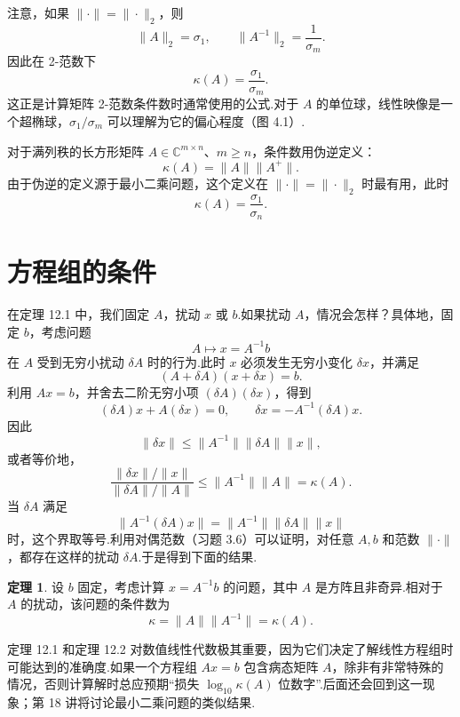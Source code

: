 \documentclass[UTF8,fontset=none,12pt]{ctexart}
\newcommand{\C}{\mathbb{C}}
\theoremstyle{definition}
\newtheorem{theorem}{定理}
\begin{document}
注意，如果 $\|\cdot\|=\|\cdot\|_2$，则
\[
    \|A\|_2=\sigma_1,\qquad \|A^{-1}\|_2=\frac1{\sigma_m}.
\]
因此在 2-范数下
\begin{equation}
    \kappa(A)=\frac{\sigma_1}{\sigma_m}.
    \tag{12.16}
\end{equation}
这正是计算矩阵 2-范数条件数时通常使用的公式.对于 $A$ 的单位球，线性映像是一个超椭球，$\sigma_1/\sigma_m$ 可以理解为它的偏心程度（图 4.1）.

对于满列秩的长方形矩阵 $A\in\C^{m\times n}$、$m\ge n$，条件数用伪逆定义：
\[
    \kappa(A)=\|A\|\|A^+\|.
\]
由于伪逆的定义源于最小二乘问题，这个定义在 $\|\cdot\|=\|\cdot\|_2$ 时最有用，此时
\begin{equation}
    \kappa(A)=\frac{\sigma_1}{\sigma_n}.
    \tag{12.17}
\end{equation}

\section*{方程组的条件}

在定理 12.1 中，我们固定 $A$，扰动 $x$ 或 $b$.如果扰动 $A$，情况会怎样？具体地，固定 $b$，考虑问题
\[
    A\mapsto x=A^{-1}b
\]
在 $A$ 受到无穷小扰动 $\delta A$ 时的行为.此时 $x$ 必须发生无穷小变化 $\delta x$，并满足
\[
    (A+\delta A)(x+\delta x)=b.
\]
利用 $Ax=b$，并舍去二阶无穷小项 $(\delta A)(\delta x)$，得到
\[
    (\delta A)x+A(\delta x)=0,
    \qquad
    \delta x=-A^{-1}(\delta A)x.
\]
因此
\[
    \|\delta x\|\le\|A^{-1}\|\|\delta A\|\|x\|,
\]
或者等价地，
\[
    \frac{\|\delta x\|/\|x\|}{\|\delta A\|/\|A\|}
    \le\|A^{-1}\|\|A\|=\kappa(A).
\]
当 $\delta A$ 满足
\[
    \|A^{-1}(\delta A)x\|
    =\|A^{-1}\|\|\delta A\|\|x\|
\]
时，这个界取等号.利用对偶范数（习题 3.6）可以证明，对任意 $A,b$ 和范数 $\|\cdot\|$，都存在这样的扰动 $\delta A$.于是得到下面的结果.

\begin{theorem}
设 $b$ 固定，考虑计算 $x=A^{-1}b$ 的问题，其中 $A$ 是方阵且非奇异.相对于 $A$ 的扰动，该问题的条件数为
\begin{equation}
    \kappa=\|A\|\|A^{-1}\|=\kappa(A).
    \tag{12.18}
\end{equation}
\end{theorem}

定理 12.1 和定理 12.2 对数值线性代数极其重要，因为它们决定了解线性方程组时可能达到的准确度.如果一个方程组 $Ax=b$ 包含病态矩阵 $A$，除非有非常特殊的情况，否则计算解时总应预期“损失 $\log_{10}\kappa(A)$ 位数字”.后面还会回到这一现象；第 18 讲将讨论最小二乘问题的类似结果.
\end{document}
